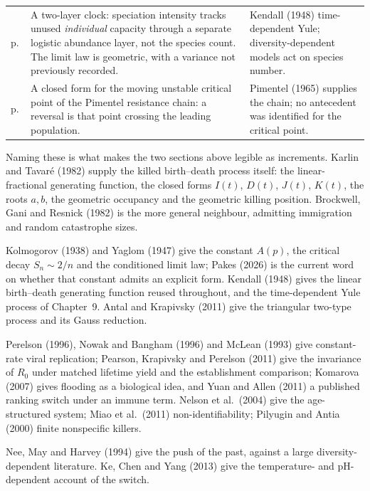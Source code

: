 {\begin{xltabular}{\linewidth}{@{}>{\raggedright\arraybackslash}p{20mm}O>{\raggedright\arraybackslash}p{40mm}@{}}
\newline p.\,\pageref{var:cor:logistic-limit} &
A two-layer clock: speciation intensity tracks unused \emph{individual} capacity through a
separate logistic abundance layer, not the species count. The limit law is geometric, with
a variance not previously recorded. &
Kendall (1948) time-dependent Yule; diversity-dependent models act on species number. \\
\addlinespace[5pt]

\newline p.\,\pageref{var:eq:icrit} &
A closed form for the moving unstable critical point of the Pimentel resistance chain: a
reversal is that point crossing the leading population. &
Pimentel (1965) supplies the chain; no antecedent was identified for the critical point. \\
\end{xltabular}\par}

\clearpage
{}

{\noindent
Naming these is what makes the two sections above legible as increments.
Karlin and Tavar\'e (1982) supply the killed birth--death process itself: the
linear-fractional generating function, the closed forms $I(t)$, $D(t)$, $J(t)$, $K(t)$, the
roots $a,b$, the geometric occupancy and the geometric killing position. Brockwell,
Gani and Resnick (1982) is the more general neighbour, admitting immigration and random
catastrophe sizes.\par
Kolmogorov (1938) and Yaglom (1947) give the constant
$A(p)$, the critical decay $S_n\sim2/n$ and the conditioned limit law; Pakes (2026)
is the current word on whether that constant admits an explicit form.
Kendall (1948) gives the linear birth--death generating function reused throughout,
and the time-dependent Yule process of Chapter~9. Antal and Krapivsky (2011) give
the triangular two-type process and its Gauss reduction.\par
Perelson (1996), Nowak
and Bangham (1996) and McLean (1993) give constant-rate viral replication;
Pearson, Krapivsky and Perelson (2011) give the invariance of $R_0$ under matched
lifetime yield and the establishment comparison; Komarova (2007) gives flooding as a
biological idea, and Yuan and Allen (2011) a published ranking switch under an immune
term. Nelson et al.\ (2004) give the age-structured system; Miao et al.\
(2011) non-identifiability; Pilyugin and Antia (2000) finite nonspecific killers.\par
Nee, May and Harvey (1994) give the push of the past, against a large
diversity-dependent literature. Ke, Chen and Yang (2013) give the temperature- and
pH-dependent account of the \yp{} switch.\par}

